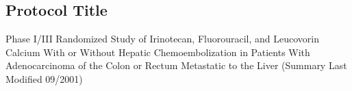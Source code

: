 \documentclass[12pt]{article}
\newcounter{qC}
\renewcommand\headrulewidth{1pt}
\renewcommand\footrulewidth{1pt}
\begin{document}
\fancypagestyle{plain}{%
    \fancyhead[L]{\today}
    \fancyfoot[C]{\thepage}
    \renewcommand\headrulewidth{1pt}
    \renewcommand\footrulewidth{1pt}}

     \makeatletter \renewcommand{} \makeatother
 
\setcounter{qC}{0}
\subsection*{Protocol Title}
Phase I/III Randomized Study of Irinotecan, Fluorouracil, and Leucovorin
Calcium With or Without Hepatic Chemoembolization in Patients With
Adenocarcinoma of the Colon or Rectum Metastatic to the Liver (Summary
Last Modified 09/2001)
\end{document}
